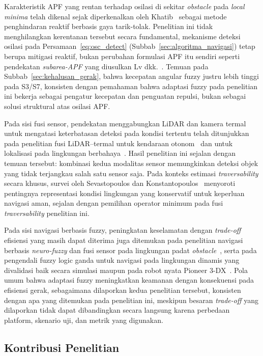 Karakteristik APF yang rentan terhadap osilasi di sekitar \textit{obstacle}
pada \textit{local minima} telah dikenal sejak diperkenalkan oleh
Khatib~\cite{Khatib1986} sebagai metode penghindaran reaktif berbasis gaya
tarik-tolak. Penelitian ini tidak menghilangkan kerentanan tersebut secara
fundamental, mekanisme deteksi osilasi pada Persamaan~\ref{eq:osc_detect}
(Subbab~\ref{sec:algoritma_navigasi}) tetap berupa mitigasi reaktif, bukan
perubahan formulasi APF itu sendiri seperti pendekatan \textit{subarea-APF}
yang diusulkan Lv dkk.~\cite{Lv2024}. Temuan pada
Subbab~\ref{sec:kehalusan_gerak}, bahwa kecepatan angular fuzzy justru lebih
tinggi pada S3/S7, konsisten dengan pemahaman bahwa adaptasi fuzzy pada
penelitian ini bekerja sebagai pengatur kecepatan dan penguatan repulsi,
bukan sebagai solusi struktural atas osilasi APF.

Pada sisi fusi sensor, pendekatan menggabungkan LiDAR dan kamera termal
untuk mengatasi keterbatasan deteksi pada kondisi tertentu telah ditunjukkan
pada penelitian fusi LiDAR--termal untuk kendaraan otonom~\cite{Choi2023}
dan untuk lokalisasi pada lingkungan berbahaya~\cite{Schichler2025}. Hasil
penelitian ini sejalan dengan temuan tersebut: kombinasi kedua modalitas
sensor memungkinkan deteksi objek yang tidak terjangkau salah satu sensor
saja. Pada konteks estimasi \textit{traversability} secara khusus, survei
oleh Sevastopoulos dan Konstantopoulos~\cite{Sevastopoulos2022} menyoroti
pentingnya representasi kondisi lingkungan yang konservatif untuk keperluan
navigasi aman, sejalan dengan pemilihan operator minimum pada fusi
\textit{traversability} penelitian ini.

Pada sisi navigasi berbasis fuzzy, peningkatan keselamatan dengan
\textit{trade-off} efisiensi yang masih dapat diterima juga ditemukan pada
penelitian navigasi berbasis \textit{neuro-fuzzy} dan fusi sensor pada
lingkungan padat \textit{obstacle}~\cite{Haider2022}, serta pada pengendali
fuzzy logic ganda untuk navigasi pada lingkungan dinamis yang divalidasi
baik secara simulasi maupun pada robot nyata Pioneer 3-DX~\cite{Benaicha2026}.
Pola umum bahwa adaptasi fuzzy meningkatkan keamanan dengan konsekuensi pada
efisiensi gerak, sebagaimana dilaporkan kedua penelitian tersebut, konsisten
dengan apa yang ditemukan pada penelitian ini, meskipun besaran
\textit{trade-off} yang dilaporkan tidak dapat dibandingkan secara langsung
karena perbedaan platform, skenario uji, dan metrik yang digunakan.

\subsection{Kontribusi Penelitian}


